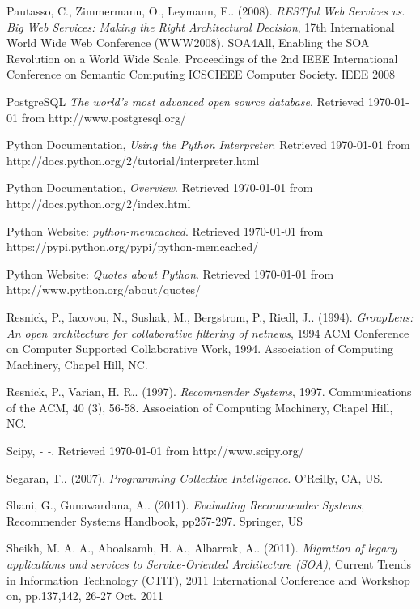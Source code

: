 \begin{thebibliography}{9}
     Pautasso, C., Zimmermann, O., Leymann, F.. (2008). \emph{RESTful Web Services vs. Big Web Services: Making the Right Architectural Decision}, 17th International World Wide Web Conference (WWW2008). SOA4All, Enabling the SOA Revolution on a World Wide Scale. Proceedings of the 2nd IEEE International Conference on Semantic Computing ICSCIEEE Computer Society. IEEE 2008

     PostgreSQL \emph{The world's most advanced open source database}. Retrieved \today{} from http://www.postgresql.org/

     Python Documentation, \emph{Using the Python Interpreter}. Retrieved \today{} from http://docs.python.org/2/tutorial/interpreter.html

     Python Documentation, \emph{Overview}. Retrieved \today{} from http://docs.python.org/2/index.html

     Python Website: \emph{python-memcached}. Retrieved \today{} from https://pypi.python.org/pypi/python-memcached/

     Python Website: \emph{Quotes about Python}. Retrieved \today{} from http://www.python.org/about/quotes/

     Resnick, P., Iacovou, N., Sushak, M., Bergstrom, P., Riedl, J.. (1994). \emph{GroupLens: An open architecture for collaborative filtering of netnews}, 1994 ACM Conference on Computer Supported Collaborative Work, 1994. Association of Computing Machinery, Chapel Hill, NC.

     Resnick, P., Varian, H. R.. (1997). \emph{Recommender Systems}, 1997. Communications of the ACM, 40 (3), 56-58. Association of Computing Machinery, Chapel Hill, NC.

     Scipy, \emph{- -}. Retrieved \today{} from http://www.scipy.org/

     Segaran, T.. (2007). \emph{Programming Collective Intelligence}. O'Reilly, CA, US.

     Shani, G., Gunawardana, A.. (2011). \emph{Evaluating Recommender Systems}, Recommender Systems Handbook, pp257-297. Springer, US

     Sheikh, M. A. A., Aboalsamh, H. A., Albarrak, A.. (2011). \emph{Migration of legacy applications and services to Service-Oriented Architecture (SOA)}, Current Trends in Information Technology (CTIT), 2011 International Conference and Workshop on, pp.137,142, 26-27 Oct. 2011


\end{thebibliography}
